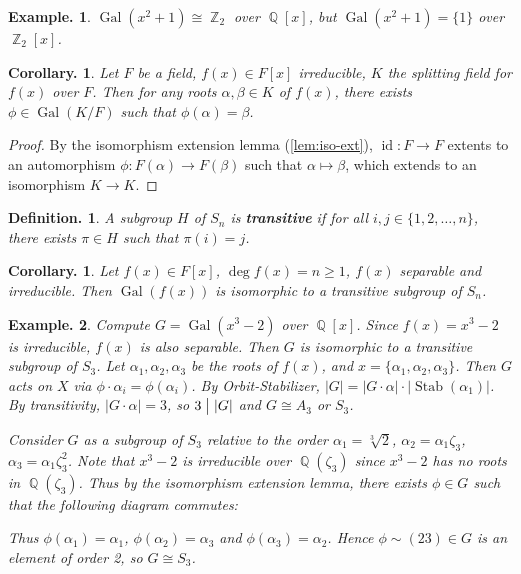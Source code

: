 \documentclass[11pt, a4paper]{memoir}
\DeclareMathOperator{\Q}{{\mathbb{Q}}}
\DeclareMathOperator{\Z}{{\mathbb{Z}}}
\newcommand{\mbf}[1]{{\boldmath\bfseries #1}}
\renewcommand{\div}{\bigm|}
\theoremstyle{change}
\newtheorem{corollary}[theorem]{Corollary.}
\theoremstyle{plain}
\theoremstyle{nonumberplain}
\newtheorem{definition}{Definition.}
\newtheorem{example}{Example.}
\newtheorem{proof}{Proof}
\DeclareMathOperator{\Gal}{Gal}
\DeclareMathOperator{\id}{id}
\DeclareMathOperator{\Stab}{Stab}
\numberwithin{equation}{section}
\begin{document}
\begin{example}
    $\Gal(x^2+1)\cong\Z_2$ over $\Q[x]$, but $\Gal(x^2+1)=\{1\}$ over $\Z_2[x]$.
\end{example}
\begin{corollary}
    Let $F$ be a field, $f(x)\in F[x]$ irreducible, $K$ the splitting field for $f(x)$ over $F$.
    Then for any roots $\alpha,\beta\in K$ of $f(x)$, there exists $\phi\in\Gal(K/F)$ such that $\phi(\alpha)=\beta$.
\end{corollary}
\begin{proof}
    By the isomorphism extension lemma (\cref{lem:iso-ext}), $\id:F\to F$ extents to an automorphism $\phi:F(\alpha)\to F(\beta)$ such that $\alpha\mapsto\beta$, which extends to an isomorphism $K\to K$.
\end{proof}
\begin{definition}
    A subgroup $H$ of $S_n$ is \mbf{transitive} if for all $i,j\in\{1,2,\ldots,n\}$, there exists $\pi\in H$ such that $\pi(i)=j$.
\end{definition}
\begin{corollary}
    Let $f(x)\in F[x]$, $\deg f(x)=n\geq 1$, $f(x)$ separable and irreducible.
    Then $\Gal(f(x))$ is isomorphic to a transitive subgroup of $S_n$.
\end{corollary}
\begin{example}
    Compute $G=\Gal(x^3-2)$ over $\Q[x]$.
    Since $f(x)=x^3-2$ is irreducible, $f(x)$ is also separable.
    Then $G$ is isomorphic to a transitive subgroup of $S_3$.
    Let $\alpha_1,\alpha_2,\alpha_3$ be the roots of $f(x)$, and $x=\{\alpha_1,\alpha_2,\alpha_3\}$.
    Then $G$ acts on $X$ via $\phi\cdot\alpha_i=\phi(\alpha_i)$.
    By Orbit-Stabilizer, $|G|=|G\cdot\alpha|\cdot|\Stab(\alpha_1)|$.
    By transitivity, $|G\cdot\alpha|=3$, so $3\div|G|$ and $G\cong A_3$ or $S_3$.

    Consider $G$ as a subgroup of $S_3$ relative to the order $\alpha_1=\sqrt[3]{2}$, $\alpha_2=\alpha_1\zeta_3$, $\alpha_3=\alpha_1\zeta_3^2$.
    Note that $x^3-2$ is irreducible over $\Q(\zeta_3)$ since $x^3-2$ has no roots in $\Q(\zeta_3)$.
    Thus by the isomorphism extension lemma, there exists $\phi\in G$ such that the following diagram commutes:
    \begin{center}
    \end{center}
    Thus $\phi(\alpha_1)=\alpha_1$, $\phi(\alpha_2)=\alpha_3$ and $\phi(\alpha_3)=\alpha_2$.
    Hence $\phi\sim(23)\in G$ is an element of order 2, so $G\cong S_3$.
\end{example}
\end{document}
